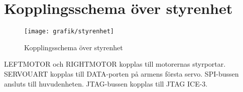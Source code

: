 \section{Kopplingsschema över styrenhet}

\begin{figure}[h]
\center
\texttt{[image: grafik/styrenhet]}
\caption{Kopplingsschema över styrenhet}
\end{figure}

LEFTMOTOR och RIGHTMOTOR kopplas till motorernas styrportar. SERVOUART kopplas till DATA-porten på armens första servo. SPI-bussen ansluts till huvudenheten. JTAG-bussen kopplas till JTAG ICE-3.
